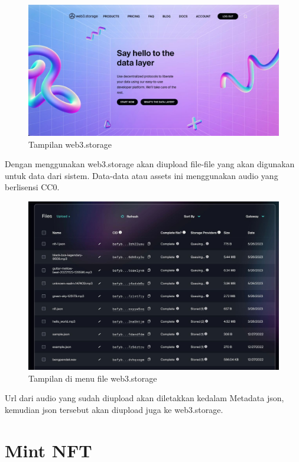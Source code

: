 \begin{figure}[H]
  \centering

  \includegraphics[scale=0.3]{gambar/web3storage.jpg}

  \caption{Tampilan web3.storage}
  \label{fig:web3storage}
\end{figure}

Dengan menggunakan web3.storage akan diupload file-file yang akan digunakan untuk data dari sistem.
Data-data atau assets ini menggunakan audio yang berlisensi CC0.

\begin{figure}[H]
  \centering

  \includegraphics[scale=0.3]{gambar/web3storageacc.jpg}

  \caption{Tampilan di menu file web3.storage}
  \label{fig:web3storageacc}
\end{figure}

Url dari audio yang sudah diupload akan diletakkan kedalam Metadata json, kemudian json tersebut akan diupload juga
ke web3.storage.

\section{Mint NFT}
